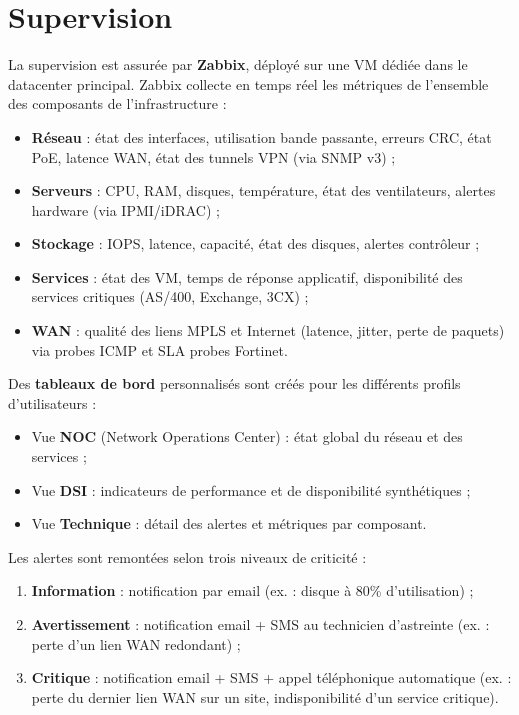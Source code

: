 \documentclass[12pt,a4paper]{report}
\begin{document}
\section{Supervision}

La supervision est assurée par \textbf{Zabbix}, déployé sur une VM dédiée dans le datacenter principal. Zabbix collecte en temps réel les métriques de l'ensemble des composants de l'infrastructure :

\begin{itemize}
\item \textbf{Réseau} : état des interfaces, utilisation bande passante, erreurs CRC, état PoE, latence WAN, état des tunnels VPN (via SNMP v3) ;
\item \textbf{Serveurs} : CPU, RAM, disques, température, état des ventilateurs, alertes hardware (via IPMI/iDRAC) ;
\item \textbf{Stockage} : IOPS, latence, capacité, état des disques, alertes contrôleur ;
\item \textbf{Services} : état des VM, temps de réponse applicatif, disponibilité des services critiques (AS/400, Exchange, 3CX) ;
\item \textbf{WAN} : qualité des liens MPLS et Internet (latence, jitter, perte de paquets) via probes ICMP et SLA probes Fortinet.
\end{itemize}

Des \textbf{tableaux de bord} personnalisés sont créés pour les différents profils d'utilisateurs :
\begin{itemize}
\item Vue \textbf{NOC} (Network Operations Center) : état global du réseau et des services ;
\item Vue \textbf{DSI} : indicateurs de performance et de disponibilité synthétiques ;
\item Vue \textbf{Technique} : détail des alertes et métriques par composant.
\end{itemize}

Les alertes sont remontées selon trois niveaux de criticité :
\begin{enumerate}
\item \textbf{Information} : notification par email (ex. : disque à 80\% d'utilisation) ;
\item \textbf{Avertissement} : notification email + SMS au technicien d'astreinte (ex. : perte d'un lien WAN redondant) ;
\item \textbf{Critique} : notification email + SMS + appel téléphonique automatique (ex. : perte du dernier lien WAN sur un site, indisponibilité d'un service critique).
\end{enumerate}
\end{document}
